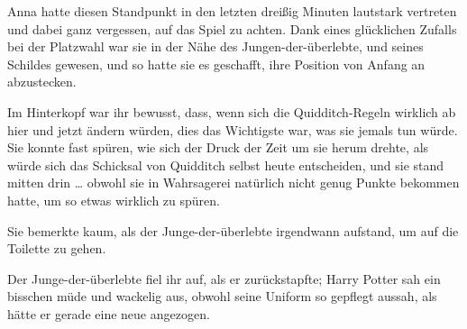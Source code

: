 Anna hatte diesen Standpunkt in den letzten dreißig Minuten lautstark vertreten und dabei ganz vergessen, auf das Spiel zu achten. Dank eines glücklichen Zufalls bei der Platzwahl war sie in der Nähe des Jungen-der-überlebte, und seines Schildes gewesen, und so hatte sie es geschafft, ihre Position von Anfang an abzustecken.

Im Hinterkopf war ihr bewusst, dass, wenn sich die Quidditch-Regeln wirklich ab hier und jetzt ändern würden, dies das Wichtigste war, was sie jemals tun würde. Sie konnte fast spüren, wie sich der Druck der Zeit um sie herum drehte, als würde sich das Schicksal von Quidditch selbst heute entscheiden, und sie stand mitten drin … obwohl sie in Wahrsagerei natürlich nicht genug Punkte bekommen hatte, um so etwas wirklich zu spüren.

Sie bemerkte kaum, als der Junge-der-überlebte irgendwann aufstand, um auf die Toilette zu gehen.

Der Junge-der-überlebte fiel ihr auf, als er zurückstapfte; Harry Potter sah ein bisschen müde und wackelig aus, obwohl seine Uniform so gepflegt aussah, als hätte er gerade eine neue angezogen.

